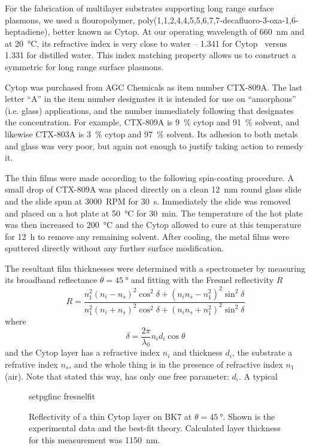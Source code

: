 For the fabrication of multilayer substrates supporting long range surface
plasmons, we used a flouropolymer,
poly(1,1,2,4,4,5,5,6,7,7-decafluoro-3-oxa-1,6-heptadiene), better known as
Cytop.  At our operating wavelength of \SI{660}{\nano\meter} and at
\SI{20}{\celsius}, its refractive index is very close to water --
1.341 for Cytop~\cite{mikevs2005synthesis} versus 1.331 for distilled
water.  This index matching property allows us to construct a symmetric for
long range surface plasmons.

Cytop was purchased from AGC Chemicals as item number CTX-809A.  The last
letter ``A'' in the item number designates it is intended for use on
``amorphous'' (i.e. glass) applications, and the number immediately
following that designates the concentration.  For example, CTX-809A is
\SI{9}{\percent} cytop and \SI{91}{\percent} solvent, and likewise CTX-803A
is \SI{3}{\percent} cytop and \SI{97}{\percent} solvent.  Its adhesion to
both metals and glass was very poor, but again not enough to justify taking
action to remedy it.

The thin films were made according to the following spin-coating procedure.
A small drop of CTX-809A was placed directly on a clean
\SI{12}{\milli\meter} round glass slide and the slide spun at
\SI{3000}{RPM} for \SI{30}{\second}.  Immediately the slide was removed and
placed on a hot plate at \SI{50}{\celsius} for \SI{30}{\minute}.  The
temperature of the hot plate was then increased to \SI{200}{\celsius} and
the Cytop allowed to cure at this temperature for \SI{12}{\hour} to remove
any remaining solvent.  After cooling, the metal films were sputtered
directly without any further surface modification.

The resultant film thicknesses were determined with a spectrometer by
measuring its broadband reflectance $\theta=\SI{45}{\degree}$ and fitting with the Fresnel
reflectivity $R$
\begin{equation}
 R = \frac{n_1^2(n_i-n_s)^2 \cos^2\delta + (n_i n_s - n_1^2)^2\sin^2\delta}
          {n_1^2(n_i+n_s)^2 \cos^2\delta + (n_i n_s + n_1^2)^2\sin^2\delta}
          \label{eqn:fitfresnel}
\end{equation}
where
\begin{equation}
 \delta = \frac{2\pi}{\lambda_0} n_i d_i \cos \theta
\end{equation}
and the Cytop layer has a refractive index $n_i$ and thickness $d_i$, the
substrate a refrative index $n_s$, and the whole thing is in the presence
of refractive index $n_1$ (air).  Note that stated this way,
 has only one free parameter: $d_i$.  A typical 

\begin{figure}
 \centering
 {setpgfinc}
 {fresnelfit}
 \caption{Reflectivity of a thin Cytop layer on BK7 at
 $\theta=\SI{45}{\degree}$.  Shown is the experimental data and the
 best-fit theory.  Calculated layer thickness for this measurement was
\SI{1150}{\nano\meter}.}
 \label{fig:fresnelfit}
\end{figure}
